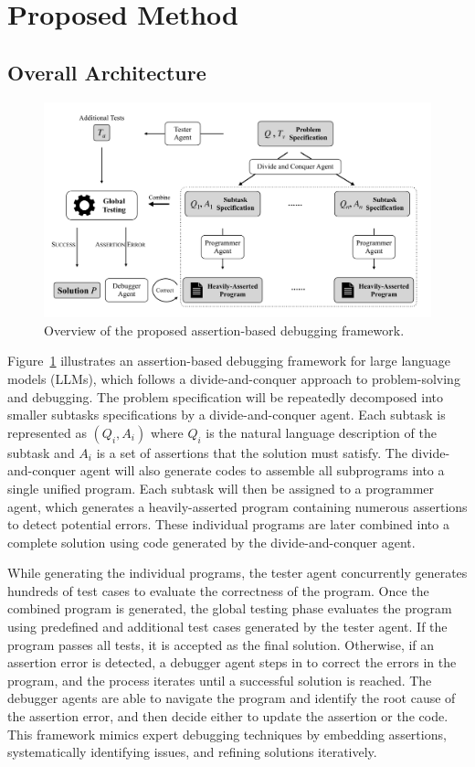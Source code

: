 
\section{Proposed Method}

\subsection{Overall Architecture}

\begin{figure}
    \centering
    \includegraphics[width=\linewidth]{Architecture.pdf}
    \caption{Overview of the proposed assertion-based debugging framework.}
    \label{fig:overview}
\end{figure}

Figure~\ref{fig:overview} illustrates an assertion-based debugging framework for large language models (LLMs), which follows a divide-and-conquer approach to problem-solving and debugging. The problem specification will be repeatedly decomposed into smaller subtasks specifications by a divide-and-conquer agent. Each subtask is represented as $(Q_i, A_i)$ where $Q_i$ is the natural language description of the subtask and $A_i$ is a set of assertions that the solution must satisfy. The divide-and-conquer agent will also generate codes to assemble all subprograms into a single unified program. Each subtask will then be assigned to a programmer agent, which generates a heavily-asserted program containing numerous assertions to detect potential errors. These individual programs are later combined into a complete solution using code generated by the divide-and-conquer agent.

While generating the individual programs, the tester agent concurrently generates hundreds of test cases to evaluate the correctness of the program. Once the combined program is generated, the global testing phase evaluates the program using predefined and additional test cases generated by the tester agent. If the program passes all tests, it is accepted as the final solution. Otherwise, if an assertion error is detected, a debugger agent steps in to correct the errors in the program, and the process iterates until a successful solution is reached. The debugger agents are able to navigate the program and identify the root cause of the assertion error, and then decide either to update the assertion or the code. This framework mimics expert debugging techniques by embedding assertions, systematically identifying issues, and refining solutions iteratively.

